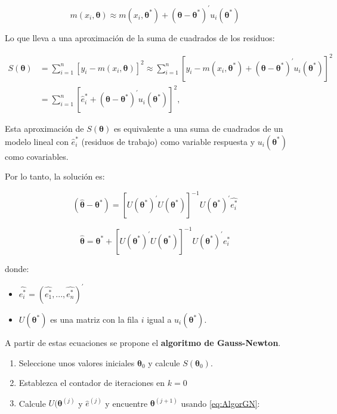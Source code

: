 \documentclass[
]{article}
\providecommand{\tightlist}{%
  \setlength{\itemsep}{0pt}\setlength{\parskip}{0pt}}
\begin{document}
\[
m(x_{i},\boldsymbol \theta)\approx m(x_{i},\boldsymbol \theta^*)+(\boldsymbol \theta-\boldsymbol \theta^*)^{'}u_{i}(\boldsymbol \theta^*)
\]

Lo que lleva a una aproximación de la suma de cuadrados de los residuos:

\begin{equation}
\begin{split}
S(\boldsymbol \theta)&=\sum_{i=1}^n[y_{i}-m(x_{i},\boldsymbol \theta)]^2 \approx \sum_{i=1}^n[y_{i}-m(x_{i},\boldsymbol \theta^*)+(\boldsymbol \theta-\boldsymbol \theta^*)^{'}u_{i}(\boldsymbol \theta^*)]^2 \\
&= \sum_{i=1}^n[\hat e_{i}^*+(\boldsymbol \theta-\boldsymbol \theta^*)^{'}u_{i}(\boldsymbol \theta^*)]^2,
\end{split}
\end{equation}

Esta aproximación de \(S(\boldsymbol \theta)\) es equivalente a una suma de cuadrados de un modelo lineal con \(\hat e_{i}^*\) (residuos de trabajo) como variable respuesta y \(u_{i}(\boldsymbol \theta^*)\) como covariables.

Por lo tanto, la solución es:

\[
(\hat{\boldsymbol \theta}-\boldsymbol \theta^*)=[U(\boldsymbol \theta^*)^{'}U(\boldsymbol \theta^*)]^{-1}
  U(\boldsymbol \theta^*)^{'} \hat{e_{i}^*}
\]

\begin{equation}
\hat{\boldsymbol \theta}=\boldsymbol \theta^*+[U(\boldsymbol \theta^*)^{'}U(\boldsymbol \theta^*)]^{-1}U(\boldsymbol \theta^*)^{'} \hat{e_{i}^*}
\label{eq:AlgorGN}
\end{equation}

donde:

\begin{itemize}
\item
  \(\hat{e_{i}^*}=(\hat{e_{1}^*},...,\hat{e_{n}^*})^{'}\)
\item
  \(U(\boldsymbol \theta^*)\) es una matriz con la fila \(i\) igual a \(u_{i}(\boldsymbol \theta^*)\).
\end{itemize}

A partir de estas ecuaciones se propone el \textbf{algoritmo de
Gauss-Newton}.

\begin{enumerate}
\def\labelenumi{\arabic{enumi}.}
\tightlist
\item
  Seleccione unos valores iniciales \(\boldsymbol \theta_{0}\) y calcule \(S(\boldsymbol \theta_{0})\).
\item
  Establezca el contador de iteraciones en \(k=0\)
\item
  Calcule \(U(\boldsymbol \theta^{(j)}\) y \(\hat{e}^{(j)}\) y encuentre \(\boldsymbol \theta^{(j+1)}\) usando \eqref{eq:AlgorGN}:
\end{enumerate}
\end{document}
